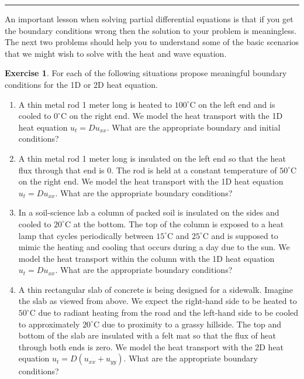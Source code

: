 \documentclass[
]{book}
\providecommand{\tightlist}{%
  \setlength{\itemsep}{0pt}\setlength{\parskip}{0pt}}
\theoremstyle{definition}
\theoremstyle{definition}
\theoremstyle{definition}
\newtheorem{exercise}{Exercise}[chapter]
\theoremstyle{remark}
\begin{document}
\begin{center}\rule{0.5\linewidth}{0.5pt}\end{center}

An important lesson when solving partial differential equations is that if you get the boundary conditions wrong then the solution to your problem is meaningless. The next two problems should help you to understand some of the basic scenarios that we might wish to solve with the heat and wave equation.

\begin{exercise}
\protect\hypertarget{exr:unnamed-chunk-543}{}{\label{exr:unnamed-chunk-543} }For each of the following situations propose meaningful boundary conditions for the 1D or 2D heat equation.

\begin{enumerate}
\def\labelenumi{\alph{enumi}.}
\tightlist
\item
  A thin metal rod 1 meter long is heated to \(100^\circ\)C on the left end and is cooled to \(0^\circ\)C on the right end. We model the heat transport with the 1D heat equation \(u_t = Du_{xx}\). What are the appropriate boundary and initial conditions?
\item
  A thin metal rod 1 meter long is insulated on the left end so that the heat flux through that end is 0. The rod is held at a constant temperature of \(50^\circ\)C on the right end. We model the heat transport with the 1D heat equation \(u_t = D u_{xx}\). What are the appropriate boundary conditions?
\item
  In a soil-science lab a column of packed soil is insulated on the sides and cooled to \(20^\circ\)C at the bottom. The top of the column is exposed to a heat lamp that cycles periodically between \(15^\circ\)C and \(25^\circ\)C and is supposed to mimic the heating and cooling that occurs during a day due to the sun. We model the heat transport within the column with the 1D heat equation \(u_t = D u_{xx}\). What are the appropriate boundary conditions?
\item
  A thin rectangular slab of concrete is being designed for a sidewalk. Imagine the slab as viewed from above. We expect the right-hand side to be heated to \(50^\circ\)C due to radiant heating from the road and the left-hand side to be cooled to approximately \(20^\circ\)C due to proximity to a grassy hillside. The top and bottom of the slab are insulated with a felt mat so that the flux of heat through both ends is zero. We model the heat transport with the 2D heat equation \(u_t = D(u_{xx} + u_{yy})\). What are the appropriate boundary conditions?
\end{enumerate}
\end{exercise}
\end{document}
